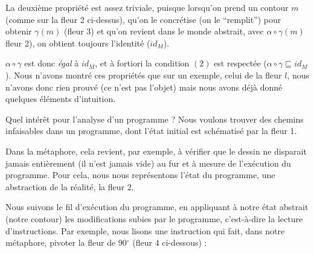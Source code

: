 \documentclass[french]{article}
\begin{document}
  \medbreak
  
  La deuxième propriété est assez triviale, puisque lorsqu'on prend un contour $m$ (comme sur la fleur 2 ci-dessus), qu'on le concrétise (on le ``remplit'') pour obtenir $\gamma (m)$ (fleur 3) et qu'on revient dans le monde abstrait, avec $\alpha \circ \gamma (m)$ fleur 2), on obtient toujours l'identité ($id_M$).
  
  $\alpha \circ \gamma$ est donc \textit{égal} à $id_M$, et à fortiori la condition $(2)$ est respectée ($\alpha \circ \gamma \sqsubseteq id_M$). Nous n'avons montré ces propriétés que sur un exemple, celui de la fleur $l$, nous n'avons donc rien prouvé (ce n'est pas l'objet) mais nous avons déjà donné quelques éléments d'intuition.
  
  \bigbreak
  
  Quel intérêt pour l'analyse d'un programme ? Nous voulons trouver des chemins infaisables dans un programme, dont l'état initial est schématisé par la fleur 1.
  
  Dans la métaphore, cela revient, par exemple, à vérifier que le dessin ne disparait jamais entièrement (il n'est jamais vide) au fur et à mesure de l'exécution du programme. Pour cela, nous nous représentons l'état du programme, une abstraction de la réalité, la fleur 2.
  
  Nous suivons le fil d'exécution du programme, en appliquant à notre état abstrait (notre contour) les modifications subies par le programme, c'est-à-dire la lecture d'instructions. Par exemple, nous lisons une instruction qui fait, dans notre métaphore, pivoter la fleur de 90$^{\circ}$ (fleur 4 ci-dessous) :  
  
\end{document}
